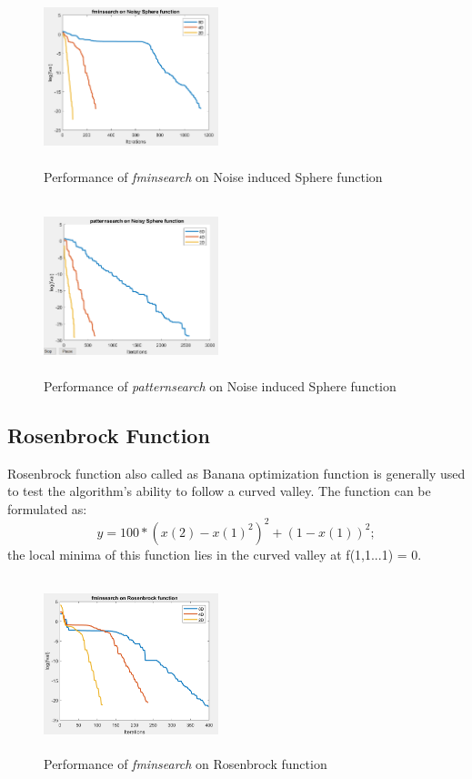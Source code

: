 \begin{figure}[H]
\includegraphics[height=2in, width=2in]{images/fminsearch_noisysphere}
\caption{Performance of \textit{fminsearch} on Noise induced Sphere function}
\end{figure}

\begin{figure}[H]
\includegraphics[height=2in, width=2in]{images/patternsearch_noisysphere}
\caption{Performance of \textit{patternsearch} on Noise induced Sphere function}
\end{figure}

\subsection{Rosenbrock Function}
Rosenbrock function also called as Banana optimization function is generally used to test the algorithm's ability to follow a curved valley. The function can be formulated as:
\begin{equation}
y = 100*(x(2) - x(1)^2)^2 + (1 - x(1))^2;
\end{equation}    
the local minima of this function lies in the curved valley at f(1,1...1) = 0.

\begin{figure}[H]
\includegraphics[height=2in, width=2in]{images/fminsearch_rosenbrock}
\caption{Performance of \textit{fminsearch} on Rosenbrock function}
\end{figure}

